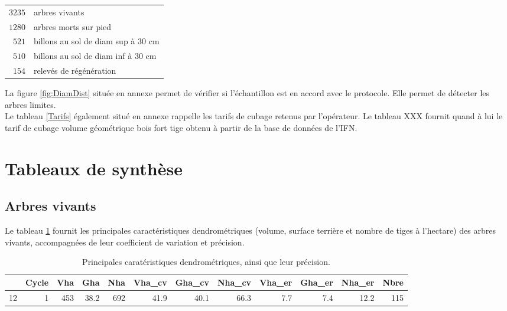 \documentclass[a4paper]{book}\usepackage[]{graphicx}\usepackage[]{color}
\begin{document}
\begin{center}
  \begin{tabular}{rl}
$3235$     & arbres vivants \\
$1280$        & arbres morts sur pied \\
$521$   & billons au sol de diam sup à 30 cm\\
$510$    & billons au sol de diam inf à 30 cm\\
$154$       & relevés de régénération \\
  \end{tabular}
\end{center}


La figure \ref{fig:DiamDist} située en annexe permet de vérifier si l'échantillon est en accord avec le protocole. Elle permet  de détecter les arbres limites. \\

Le tableau \ref{Tarifs} également situé en annexe rappelle les tarifs de cubage retenus par l'opérateur. Le tableau XXX fournit quand à lui le tarif de cubage volume géométrique bois fort tige obtenu à partir de la base de données de l'IFN.


\section{Tableaux de synthèse}
\subsection{Arbres vivants}
Le tableau \ref{Dendro} fournit les principales caractéristiques dendrométriques (volume, surface terrière et nombre de tiges à l'hectare) des arbres vivants, accompagnées de leur coefficient de variation et précision. \\

\begin{table}[ht]
\centering
{\footnotesize
\begin{tabular}{rrrrrrrrrrrr}
  \hline
 & Cycle & Vha & Gha & Nha & Vha\_cv & Gha\_cv & Nha\_cv & Vha\_er & Gha\_er & Nha\_er & Nbre \\ 
  \hline
12 & 1 & 453 & 38.2 & 692 & 41.9 & 40.1 & 66.3 & 7.7 & 7.4 & 12.2 & 115 \\ 
   \hline
\end{tabular}
}
\caption{Principales caratéristiques dendrométriques, ainsi que leur précision.} 
\label{Dendro}
\end{table}
\end{document}
